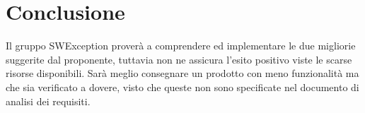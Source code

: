 \section{Conclusione}
Il gruppo SWException proverà a comprendere ed implementare le due migliorie suggerite dal proponente, tuttavia non ne assicura l'esito positivo viste le scarse risorse disponibili.
Sarà meglio consegnare un prodotto con meno funzionalità ma che sia verificato a dovere, visto che queste non sono specificate nel documento di analisi dei requisiti.
